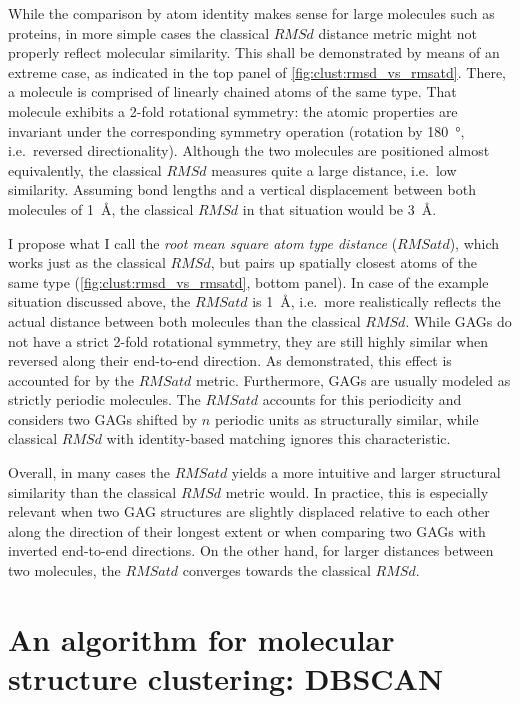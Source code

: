While the comparison by atom identity makes sense for large molecules such as
proteins, in more simple cases the classical $RMSd$ distance metric might not
properly reflect molecular similarity. This shall be demonstrated by means of an
extreme case, as indicated in the top panel of
\cref{fig:clust:rmsd_vs_rmsatd}. There, a molecule is comprised of linearly
chained atoms of the same type. That molecule exhibits a 2-fold rotational
symmetry: the atomic properties are invariant under the corresponding symmetry
operation (rotation by \SI{180}{\degree}, i.e.\ reversed directionality).
Although the two molecules are positioned almost equivalently, the classical
$RMSd$ measures quite a large distance, i.e.\ low similarity. Assuming bond
lengths and a vertical displacement between both molecules of \SI{1}{\angstrom},
the classical $RMSd$ in that situation would be \SI{3}{\angstrom}.

I propose what I call the \textit{root mean square atom type distance}
($RMSatd$), which works just as the classical $RMSd$, but pairs up spatially
closest atoms of the same type (\cref{fig:clust:rmsd_vs_rmsatd}, bottom panel).
In case of the example situation discussed above, the $RMSatd$ is
\SI{1}{\angstrom}, i.e.\ more realistically reflects the actual distance between
both molecules than the classical $RMSd$. While GAGs do not have a strict 2-fold
rotational symmetry, they are still highly similar when reversed along
their end-to-end direction. As demonstrated, this effect is accounted for by the
$RMSatd$ metric. Furthermore, GAGs are usually modeled as strictly periodic
molecules. The $RMSatd$ accounts for this periodicity and considers two GAGs
shifted by $n$ periodic units as structurally similar, while classical $RMSd$
with identity-based matching ignores this characteristic.

Overall, in many cases the $RMSatd$ yields a more intuitive and larger
structural similarity than the classical $RMSd$ metric would. In practice, this
is especially relevant when two GAG structures are slightly displaced relative
to each other along the direction of their longest extent or when comparing two
GAGs with inverted end-to-end directions. On the other hand, for larger
distances between two molecules, the $RMSatd$ converges towards the classical
$RMSd$.


\section{An algorithm for molecular structure clustering: DBSCAN}

